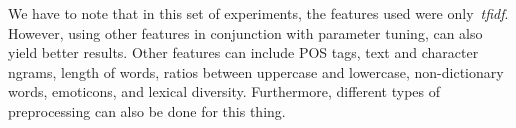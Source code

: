 \documentclass[a4paper]{llncs}
\begin{document}
We have to note that in this set of experiments, the features used were only~\textit{tfidf}. However, using other features in conjunction with parameter tuning, can also yield better results. Other features can include POS tags, text and character ngrams, length of words, ratios between uppercase and lowercase, non-dictionary words, emoticons, and lexical diversity. Furthermore, different types of preprocessing can also be done for this thing. 





\end{document}
